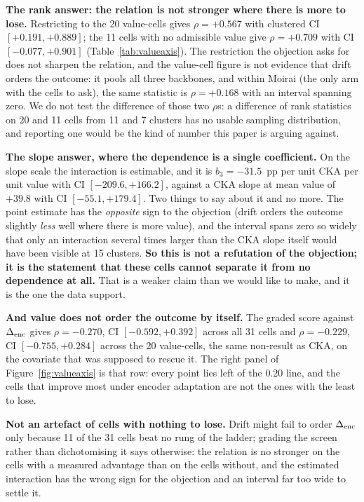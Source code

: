 \textbf{The rank answer: the relation is not stronger where there is more to
lose.}  Restricting to the 20 value-cells gives $\rho{=}{+}0.567$ with clustered
CI $[{+}0.191, {+}0.889]$; the 11 cells with no admissible value give
$\rho{=}{+}0.709$ with CI $[-0.077, {+}0.901]$ (Table~\ref{tab:valueaxis}).  The
restriction the objection asks for does not sharpen the relation, and the
value-cell figure is not evidence that drift orders the outcome: it pools all three
backbones, and within Moirai (the only arm with the cells to ask), the same
statistic is $\rho{=}{+}0.168$ with an interval spanning zero.  We do not test the
difference of those two $\rho$s: a difference of rank statistics on 20 and 11 cells
from 11 and 7 clusters has no usable sampling distribution, and reporting one would
be the kind of number this paper is arguing against.

\textbf{The slope answer, where the dependence is a single coefficient.}  On the
slope scale the interaction is estimable, and it is $b_3{=}{-}31.5$~pp per unit CKA
per unit value with CI $[-209.6, {+}166.2]$, against a CKA slope at mean value of
$+39.8$ with CI $[-55.1, {+}179.4]$.  Two things to say about it and no more.  The
point estimate has the \emph{opposite} sign to the objection (drift orders the
outcome slightly \emph{less} well where there is more value), and the interval
spans zero so widely that only an interaction several times larger than the CKA
slope itself would have been visible at 15 clusters.  \textbf{So this is not a
refutation of the objection; it is the statement that these cells cannot separate
it from no dependence at all.}  That is a weaker claim than we would like to make,
and it is the one the data support.

\textbf{And value does not order the outcome by itself.}  The graded score against
$\Delta_\text{enc}$ gives $\rho{=}{-}0.270$, CI $[-0.592, {+}0.392]$ across all 31 cells and
$\rho{=}{-}0.229$, CI $[-0.755, {+}0.284]$ across the 20 value-cells, the same
non-result as CKA, on the covariate that was supposed to rescue it.  The right
panel of Figure~\ref{fig:valueaxis} is that row: every point lies left of the
$0.20$ line, and the cells that improve most under encoder adaptation are not the
ones with the least to lose.

\textbf{Not an artefact of cells with nothing to lose.}  Drift might fail to order
$\Delta_\text{enc}$ only because 11 of the 31 cells beat no rung of the ladder; grading the
screen rather than dichotomising it says otherwise: the relation is no stronger on
the cells with a measured advantage than on the cells without, and the estimated
interaction has the wrong sign for the objection and an interval far too wide to
settle it.

